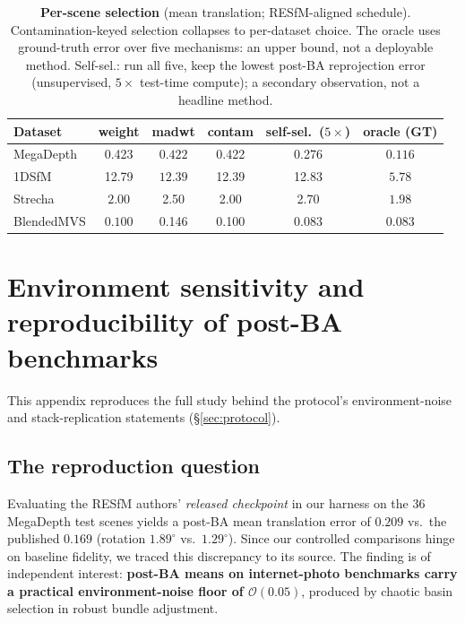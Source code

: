 \documentclass{article}
\renewcommand{\deg}{^{\circ}}
\begin{document}
\begin{table}[t]\centering\footnotesize
\setlength{\tabcolsep}{3pt}%
\caption{\textbf{Per-scene selection} (mean translation; RESfM-aligned schedule).
Contamination-keyed selection collapses to per-dataset choice. The oracle uses
ground-truth error over five mechanisms: an upper bound, not a deployable method.
Self-sel.: run all five, keep the lowest post-BA reprojection error (unsupervised,
$5\times$ test-time compute); a secondary observation, not a headline method.}
\label{tab:selector}
\begin{tabular}{lccccc}
\toprule
Dataset & weight & madwt & contam & self-sel.\ ($5\times$) & oracle (GT)\\
\midrule
MegaDepth  & 0.423 & $\mathbf{0.422}$ & 0.422 & 0.276 & $\mathit{0.116}$\\
1DSfM      & 12.79 & $\mathbf{12.39}$ & 12.39 & 12.83 & $\mathit{5.78}$\\
Strecha    & $\mathbf{2.00}$ & 2.50 & 2.00 & 2.70 & $\mathit{1.98}$\\
BlendedMVS & $\mathbf{0.100}$ & 0.146 & 0.100 & 0.083 & $\mathit{0.083}$\\
\bottomrule
\end{tabular}
\end{table}


\clearpage
\section{Environment sensitivity and reproducibility of post-BA benchmarks}\label{app:repro}
This appendix reproduces the full study behind the protocol's environment-noise and
stack-replication statements (\S\ref{sec:protocol}).

\subsection{The reproduction question}\label{sec:repro}
Evaluating the RESfM authors' \emph{released checkpoint} in our harness on the 36 MegaDepth
test scenes yields a post-BA mean translation error of $0.209$ vs.\ the published $0.169$
(rotation $1.89\deg$ vs.\ $1.29\deg$). Since our controlled comparisons hinge on baseline
fidelity, we traced this discrepancy to its source. The finding is of independent
interest: \textbf{post-BA means on internet-photo benchmarks carry a practical
environment-noise floor of $\mathcal{O}(0.05)$}, produced by chaotic basin selection in
robust bundle adjustment.
\end{document}
